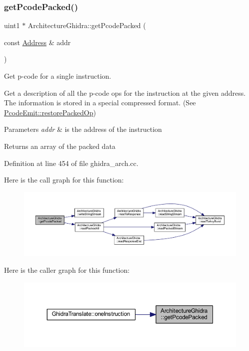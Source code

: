 \subsubsection{\texorpdfstring{getPcodePacked()}{getPcodePacked()}}
{\footnotesize\ttfamily uint1 $\ast$ Architecture\+Ghidra\+::get\+Pcode\+Packed (\begin{DoxyParamCaption}\item[{const \mbox{\hyperlink{class_address}{Address}} \&}]{addr }\end{DoxyParamCaption})}



Get p-\/code for a single instruction. 

Get a description of all the p-\/code ops for the instruction at the given address. The information is stored in a special compressed format. (See \mbox{\hyperlink{class_pcode_emit_a8136f8c678e250f77907ed57dc6956ac}{Pcode\+Emit\+::restore\+Packed\+Op}}) 
\begin{DoxyParams}{Parameters}
{\em addr} & is the address of the instruction \\
\hline
\end{DoxyParams}
\begin{DoxyReturn}{Returns}
an array of the packed data 
\end{DoxyReturn}


Definition at line 454 of file ghidra\+\_\+arch.\+cc.

Here is the call graph for this function\+:
\nopagebreak
\begin{figure}[H]
\begin{center}
\leavevmode
\includegraphics[width=350pt]{class_architecture_ghidra_a4ebbc30bfe4806007c73b4c5ea0645bf_cgraph}
\end{center}
\end{figure}
Here is the caller graph for this function\+:
\nopagebreak
\begin{figure}[H]
\begin{center}
\leavevmode
\includegraphics[width=350pt]{class_architecture_ghidra_a4ebbc30bfe4806007c73b4c5ea0645bf_icgraph}
\end{center}
\end{figure}
\mbox{\label{class_architecture_ghidra_ad1e8a5eaefce58038fc774a6083818e8}} 
